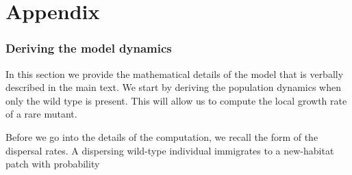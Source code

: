 \documentclass[11pt]{article}
\begin{document}




\clearpage


\renewcommand*{\thepage}{S\arabic{page}}

\renewcommand\theequation{S\arabic{equation}}
\renewcommand\thesection{S\arabic{section}}
\renewcommand\thefigure{S\arabic{figure}}

\resetlinenumber
\renewcommand\thelinenumber{S\arabic{linenumber}}
\linenumbers{}
\modulolinenumbers[2]

\appendix 


\part{Appendix} %
\parttoc %





\clearpage

\renewcommand{\theequation}{A\arabic{equation}}
\setcounter{equation}{0}  %
\renewcommand{\thetable}{A\arabic{table}}
\setcounter{figure}{0}
\setcounter{table}{0}

\section{Deriving the model dynamics \label{sec:app:modeldyn}}
In this section we provide the mathematical details of the model that is verbally described in the main text. We start by deriving the population dynamics when only the wild type is present. This will allow us to compute the local growth rate of a rare mutant.  

Before we go into the details of the computation, we recall the form of the dispersal rates. A dispersing wild-type individual immigrates to a new-habitat patch with probability
\end{document}

